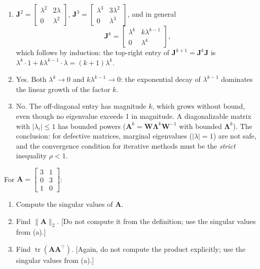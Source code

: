 \begin{solution}
    \begin{enumerate}[label=(\alph*)]
        \item $\mathbf{J}^2 = \begin{bmatrix} \lambda^2 & 2\lambda \\ 0 & \lambda^2 \end{bmatrix}$, $\mathbf{J}^3 = \begin{bmatrix} \lambda^3 & 3\lambda^2 \\ 0 & \lambda^3 \end{bmatrix}$, and in general
        \begin{equation*}
            \mathbf{J}^k = \begin{bmatrix} \lambda^k & k\lambda^{k-1} \\ 0 & \lambda^k \end{bmatrix},
        \end{equation*}
        which follows by induction: the top-right entry of $\mathbf{J}^{k+1} = \mathbf{J}^k \mathbf{J}$ is $\lambda^k \cdot 1 + k\lambda^{k-1} \cdot \lambda = (k+1)\lambda^k$.
        \item Yes. Both $\lambda^k \to 0$ and $k\lambda^{k-1} \to 0$: the exponential decay of $\lambda^{k-1}$ dominates the linear growth of the factor $k$.
        \item No. The off-diagonal entry has magnitude $k$, which grows without bound, even though no eigenvalue exceeds 1 in magnitude. A diagonalizable matrix with $|\lambda_i| \leq 1$ has bounded powers ($\mathbf{A}^k = \mathbf{W}\boldsymbol{\Lambda}^k\mathbf{W}^{-1}$ with bounded $\boldsymbol{\Lambda}^k$). The conclusion: for defective matrices, marginal eigenvalues ($|\lambda| = 1$) are not safe, and the convergence condition for iterative methods must be the \emph{strict} inequality $\rho < 1$.
    \end{enumerate}
\end{solution}

\begin{exercise} %
    For $\mathbf{A} = \begin{bmatrix} 3 & 1 \\ 0 & 3 \\ 1 & 0 \end{bmatrix}$:
    \begin{enumerate}[label=(\alph*)]
        \item Compute the singular values of $\mathbf{A}$.
        \item Find $\|\mathbf{A}\|_2$. [Do not compute it from the definition; use the singular values from (a).]
        \item Find $\operatorname{tr}(\mathbf{A}\mathbf{A}^\top)$. [Again, do not compute the product explicitly; use the singular values from (a).]
    \end{enumerate}
\end{exercise}


